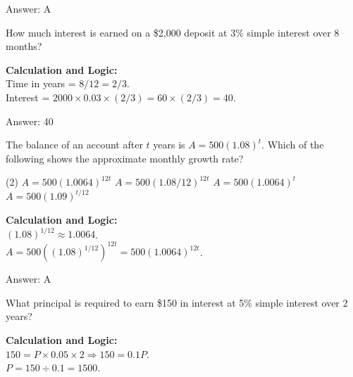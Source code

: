 \documentclass[11pt,paper=a4,answers]{exam}
\begin{document}
\begin{questions}
\begin{solution}
Answer: \colorbox{yellow!100}{A}
\end{solution}

\vspace{60pt}

\question
How much interest is earned on a \$2,000 deposit at 3\% simple interest over 8 months?

\begin{solution}
\textbf{Calculation and Logic:} \\
Time in years = $8/12 = 2/3$. \\
Interest = $2000 \times 0.03 \times (2/3) = 60 \times (2/3) = 40$.

\vspace{30pt}

Answer: \colorbox{yellow!100}{40}
\end{solution}

\vspace{60pt}

\question
The balance of an account after $t$ years is $A = 500(1.08)^t$. Which of the following shows the approximate monthly growth rate?
\begin{tasks}(2)
    \task $A = 500(1.0064)^{12t}$
    \task $A = 500(1.08/12)^{12t}$
    \task $A = 500(1.0064)^{t}$
    \task $A = 500(1.09)^{t/12}$
\end{tasks}

\begin{solution}
\textbf{Calculation and Logic:} \\
$(1.08)^{1/12} \approx 1.0064$. \\
$A = 500((1.08)^{1/12})^{12t} = 500(1.0064)^{12t}$.

\vspace{30pt}

Answer: \colorbox{yellow!100}{A}
\end{solution}

\vspace{60pt}

\question
What principal is required to earn \$150 in interest at 5\% simple interest over 2 years?

\begin{solution}
\textbf{Calculation and Logic:} \\
$150 = P \times 0.05 \times 2 \Rightarrow 150 = 0.1P$. \\
$P = 150 \div 0.1 = 1500$.


\end{solution}
\end{questions}
\end{document}
